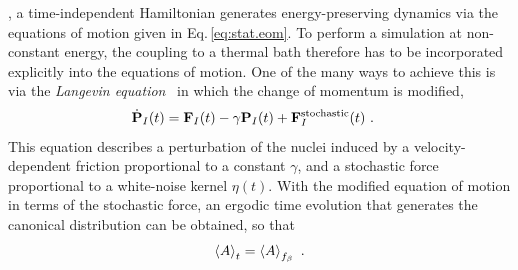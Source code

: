 , a time-independent Hamiltonian generates energy-preserving dynamics via the equations of motion given in Eq.\,\eqref{eq:stat.eom}. To perform a simulation at non-constant energy, the coupling to a thermal bath therefore has to be incorporated explicitly into the equations of motion. One of the many ways to achieve this is via the \emph{Langevin equation}~\cite{Vanden2006} in which the change of momentum is modified,
\begin{align}
	\dot{\b P}_I (t) 
		&= \b F_I (t) - \gamma \b P_I (t) + \b F^{\rm stochastic}_I (t)~.
	\label{eq:stat.Langevin}
\end{align}
This equation describes a perturbation of the nuclei induced by a velocity-dependent friction proportional to a constant $\gamma$,%
and a stochastic force proportional to a white-noise kernel $\eta (t)$. With the modified equation of motion in terms of the stochastic force, an ergodic time evolution that generates the canonical distribution can be obtained, so that
\begin{align}
  \braket{A}_t = \braket{A}_{f_\beta}~.
\end{align}

 \cite[p.\,590]{Tuckerman}



